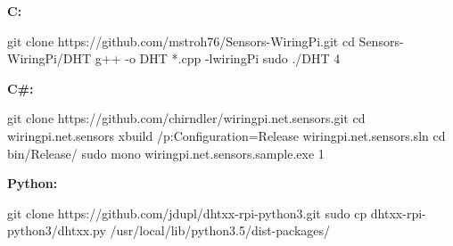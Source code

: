 

\textbf{C:}

\begin{console}
git clone https://github.com/mstroh76/Sensors-WiringPi.git
cd Sensors-WiringPi/DHT
g++ -o DHT *.cpp -lwiringPi	
sudo ./DHT 4
\end{console}

\textbf{C\#:}

\begin{console}
git clone https://github.com/chirndler/wiringpi.net.sensors.git
cd wiringpi.net.sensors
xbuild /p:Configuration=Release wiringpi.net.sensors.sln
cd bin/Release/
sudo mono wiringpi.net.sensors.sample.exe 1
\end{console}

\textbf{Python:}
\begin{console}
git clone https://github.com/jdupl/dhtxx-rpi-python3.git
sudo cp dhtxx-rpi-python3/dhtxx.py /usr/local/lib/python3.5/dist-packages/
\end{console}

\lstset{language=Python, caption=, 
        label=DHT22Program, frame=single, basicstyle=\ttfamily
	      \footnotesize, breakatwhitespace=false, showstringspaces=false, 
        showtabs=false, tabsize=2 }

